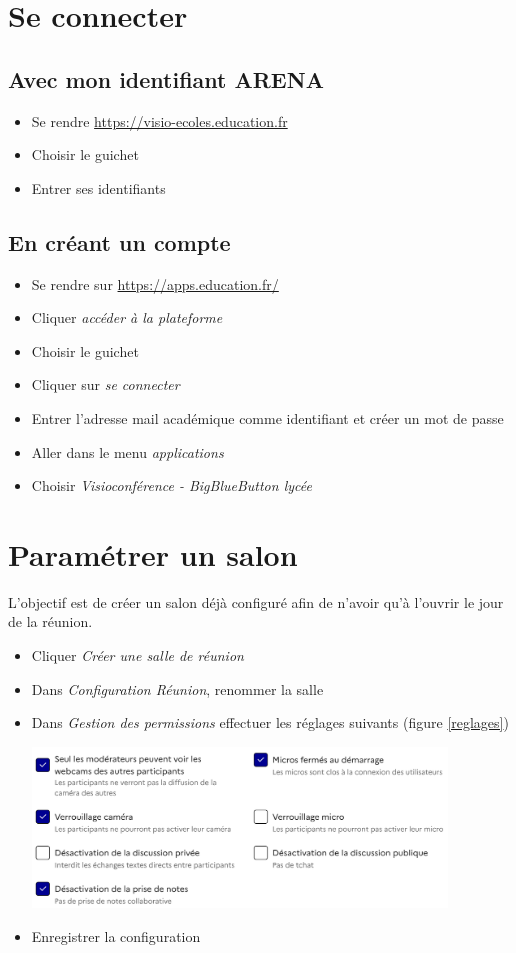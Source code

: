 \documentclass[a4paper,11pt]{article}
\begin{document}
\section{Se connecter}
\subsection{Avec mon identifiant ARENA}
\begin{itemize}
    \item Se rendre \url{https://visio-ecoles.education.fr}
    \item Choisir le guichet
    \item Entrer ses identifiants
\end{itemize}
\subsection{En créant un compte}
\begin{itemize}
    \item Se rendre sur \url{https://apps.education.fr/}
    \item Cliquer \emph{accéder à la plateforme}
    \item Choisir le guichet
    \item Cliquer sur \emph{se connecter}
    \item Entrer l'adresse mail académique comme identifiant et créer un mot de passe
    \item Aller dans le menu \emph{applications}
    \item Choisir \emph{Visioconférence - BigBlueButton lycée}
\end{itemize}
\section{Paramétrer un salon}
L'objectif est de créer un salon déjà configuré afin de n'avoir qu'à l'ouvrir le jour de la réunion.
\begin{itemize}
    \item Cliquer \emph{Créer une salle de réunion}
    \item Dans \emph{Configuration Réunion}, renommer la salle
    \item Dans \emph{Gestion des permissions} effectuer les réglages suivants (figure \ref{reglages})
          \begin{center}
              \centering
              \includegraphics[width=11cm]{ressources/reglages.png}
              \label{reglages}
          \end{center}
    \item Enregistrer la configuration
\end{itemize}
\end{document}
